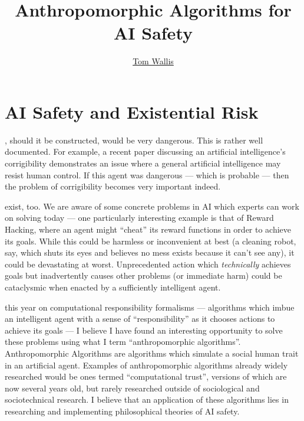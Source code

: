 
\title{Anthropomorphic Algorithms for AI Safety}
\author[Tom Wallis]{\href{http://tom.coffee}{Tom Wallis}}
\date{}



\maketitle

\section{AI Safety and Existential Risk}

, should it be constructed, would be very dangerous. This is rather well documented. For example, a recent paper discussing an artificial intelligence's corrigibility\cite{corrigability} demonstrates an issue where a general artificial intelligence may resist human control. If this agent was dangerous --- which is probable --- then the problem of corrigibility becomes very important indeed.\par

 exist, too. We are aware of some concrete problems in AI which experts can work on solving today\cite{concrete_problems} --- one particularly interesting example is that of Reward Hacking, where an agent might ``cheat'' its reward functions in order to achieve its goals. While this could be harmless or inconvenient at best (a cleaning robot, say, which shuts its eyes and believes no mess exists because it can't see any), it could be devastating at worst. Unprecedented action which \emph{technically} achieves goals but inadvertently causes other problems (or immediate harm) could be cataclysmic when enacted by a sufficiently intelligent agent.\par

 this year on computational responsibility formalisms --- algorithms which imbue an intelligent agent with a sense of ``responsibility'' as it chooses actions to achieve its goals --- I believe I have found an interesting opportunity to solve these problems using what I term ``anthropomorphic algorithms''. Anthropomorphic Algorithms are algorithms which simulate a social human trait in an artificial agent. Examples of anthropomorphic algorithms already widely researched would be ones termed ``computational trust'', versions of which are now several years old\cite{marsh1994}, but rarely researched outside of sociological and sociotechnical research. I believe that an application of these algorithms lies in researching and implementing philosophical theories of AI safety. \par

